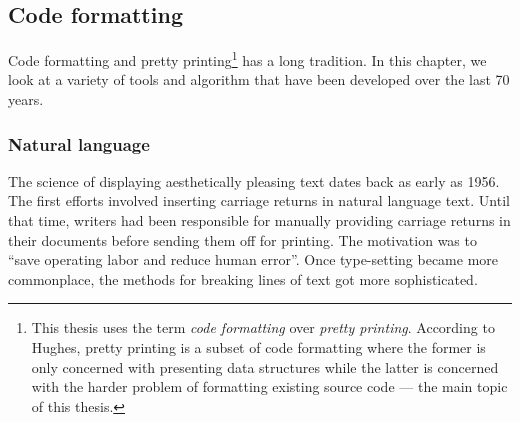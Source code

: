 
\subsection{Code formatting}
%

Code formatting and pretty printing\footnote{
  This thesis uses the term \emph{code formatting} over \emph{pretty printing}.
  According to Hughes\autocite{hughes_design_1995}, pretty printing is a subset of code formatting where
  the former is only concerned with presenting data structures while the latter is
  concerned with the harder problem of formatting existing source code --- the main topic of this thesis.} has a long tradition.
In this chapter, we look at a variety of tools and algorithm that have been developed over the last 70 years.

\subsubsection{Natural language}
The science of displaying aesthetically pleasing text dates back as early as 1956\autocite{harris_keyboard_1956}.
The first efforts involved inserting carriage returns in natural language text.
Until that time, writers had been responsible for manually providing carriage returns in their documents before sending them off for printing.
The motivation was to ``save operating labor and reduce human error''.
Once type-setting became more commonplace, the methods for breaking lines of text got more sophisticated.

